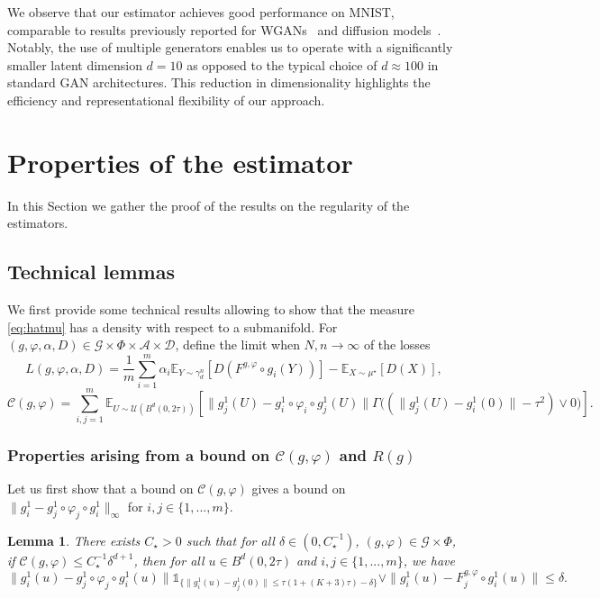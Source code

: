 \documentclass[10pt]{article}
\newtheorem{lemma}{Lemma}
\begin{document}
We observe that our estimator achieves good performance on MNIST, comparable to results previously reported for WGANs~\citep{cheng2020analysis} and diffusion models~\citep{wang2025application}. Notably, the use of multiple generators enables us to operate with a significantly smaller latent dimension \( d = 10 \) as opposed to the typical choice of \( d \approx 100 \) in standard GAN architectures. This reduction in dimensionality highlights the efficiency and representational flexibility of our approach.



\appendix
\vspace{0.4cm}

 
\section{Properties of the estimator}
In this Section we gather the proof of the results on the regularity of the estimators.




\subsection{Technical lemmas}
We first provide some technical results allowing to show that the measure \eqref{eq:hatmu} has a density with respect to a submanifold.
For \( (g, \varphi,\alpha,D) \in \mathcal{G} \times \Phi \times \mathcal{A}\times \mathcal{D} \), define the limit when $N,n\rightarrow \infty$ of the losses  $$L(g,\varphi,\alpha,D)=\frac{1}{m}\sum_{i=1}^m \alpha_i \mathbb{E}_{Y\sim \gamma_d^n}[ D(F^{g,\varphi}\circ g_{i}(Y))]-\mathbb{E}_{X\sim \mu^\star}[ D(X)],$$
$$
\mathcal{C}(g,\varphi)=\sum_{i,j=1}^m\mathbb{E}_{U\sim \mathcal{U}(B^d(0,2\tau))}[\|g_{j}^1(U)-g_i^1\circ \varphi_i\circ g_{j}^1(U)\|\Gamma\big((\|g_j^1(U) - g_i^1(0)\|-\tau^2)\vee 0\big)].
$$

\subsubsection{Properties arising from a bound on $\mathcal{C}(g,\varphi)$ and $R(g)$}
Let us first show that a bound on $\mathcal{C}(g,\varphi)$ gives a bound on $\|g_i^1-g_{j}^1\circ\varphi_j\circ g_{i}^1\|_\infty$ for $i,j\in \{1,...,m\}$.
\begin{lemma}\label{lemma:secondr} There exists $C_\star>0$ such that for all $\delta\in (0,C_\star^{-1})$, $(g,\varphi)\in \mathcal{G}\times  \Phi$, if $\mathcal{C}(g,\varphi)\leq C_\star^{-1}\delta^{d+1}$, then  
    for all $u\in B^d(0,2\tau)$ and $i,j\in \{1,...,m\}$, we have
    $$\|g_i^1(u)-g_{j}^1\circ\varphi_j\circ g_{i}^1(u)\|\mathds{1}_{\{\|g_{i}^1(u)-g_j^1(0)\|\leq \tau(1+(K+3)\tau)-\delta\}}\vee\|g_i^1(u)-F^{g,\varphi}_{j}\circ g_{i}^1(u)\|\leq \delta.$$
\end{lemma}
\end{document}
